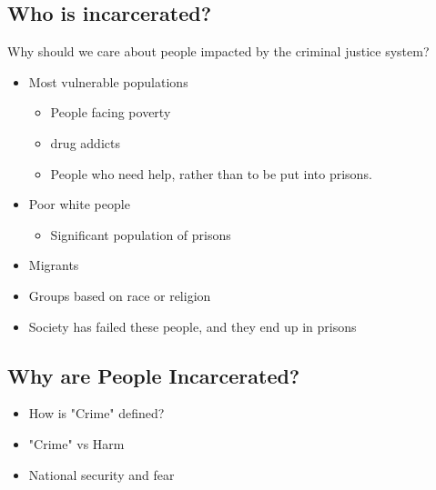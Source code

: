\documentclass{article}
\begin{document}
\subsection{Who is incarcerated?}
Why should we care about people impacted by the criminal justice system?
\begin{itemize}
  \item Most vulnerable populations
    \begin{itemize}
      \item People facing poverty
      \item drug addicts
      \item People who need help, rather than to be put into prisons.
    \end{itemize}
  \item Poor white people
    \begin{itemize}
      \item Significant population of prisons
    \end{itemize}
  \item Migrants
  \item Groups based on race or religion
  \item Society has failed these people, and they
    end up in prisons
\end{itemize}

\subsection{Why are People Incarcerated?}
\begin{itemize}
  \item How is "Crime" defined?
  \item "Crime" vs Harm
  \item National security and fear
\end{itemize}
\end{document}
